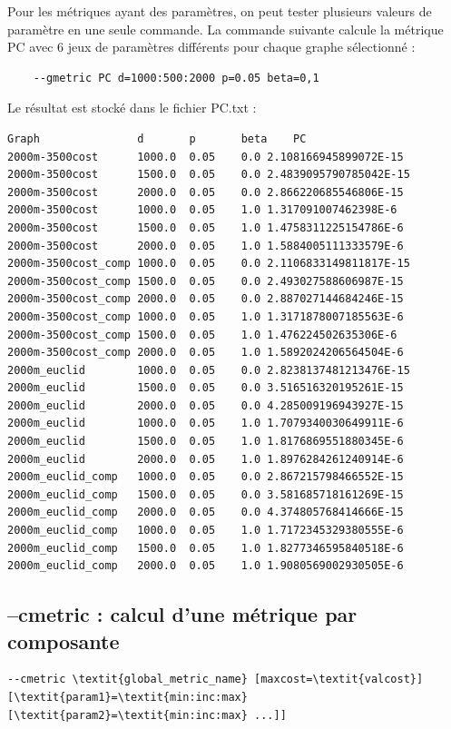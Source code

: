 \documentclass[a4paper,10pt]{report}
\begin{document}
Pour les métriques ayant des paramètres, on peut tester plusieurs valeurs de paramètre en une seule commande.
La commande suivante calcule la métrique PC avec 6 jeux de paramètres différents pour chaque graphe sélectionné :
\begin{Verbatim}
	--gmetric PC d=1000:500:2000 p=0.05 beta=0,1
\end{Verbatim}
Le résultat est stocké dans le fichier PC.txt :
\begin{Verbatim}
Graph               d     	p   	beta	PC
2000m-3500cost      1000.0	0.05	0.0	2.108166945899072E-15
2000m-3500cost      1500.0	0.05	0.0	2.4839095790785042E-15
2000m-3500cost      2000.0	0.05	0.0	2.866220685546806E-15
2000m-3500cost      1000.0	0.05	1.0	1.317091007462398E-6
2000m-3500cost      1500.0	0.05	1.0	1.4758311225154786E-6
2000m-3500cost      2000.0	0.05	1.0	1.5884005111333579E-6
2000m-3500cost_comp 1000.0	0.05	0.0	2.1106833149811817E-15
2000m-3500cost_comp 1500.0	0.05	0.0	2.493027588606987E-15
2000m-3500cost_comp 2000.0	0.05	0.0	2.887027144684246E-15
2000m-3500cost_comp 1000.0	0.05	1.0	1.3171878007185563E-6
2000m-3500cost_comp 1500.0	0.05	1.0	1.476224502635306E-6
2000m-3500cost_comp 2000.0	0.05	1.0	1.5892024206564504E-6
2000m_euclid        1000.0	0.05	0.0	2.8238137481213476E-15
2000m_euclid        1500.0	0.05	0.0	3.516516320195261E-15
2000m_euclid        2000.0	0.05	0.0	4.285009196943927E-15
2000m_euclid        1000.0	0.05	1.0	1.7079340030649911E-6
2000m_euclid        1500.0	0.05	1.0	1.8176869551880345E-6
2000m_euclid        2000.0	0.05	1.0	1.8976284261240914E-6
2000m_euclid_comp   1000.0	0.05	0.0	2.867215798466552E-15
2000m_euclid_comp   1500.0	0.05	0.0	3.581685718161269E-15
2000m_euclid_comp   2000.0	0.05	0.0	4.374805768414666E-15
2000m_euclid_comp   1000.0	0.05	1.0	1.7172345329380555E-6
2000m_euclid_comp   1500.0	0.05	1.0	1.8277346595840518E-6
2000m_euclid_comp   2000.0	0.05	1.0	1.9080569002930505E-6
\end{Verbatim}



\subsection{--cmetric : calcul d'une métrique par composante}
\begin{Verbatim}[commandchars=\\\{\}]
--cmetric \textit{global_metric_name} [maxcost=\textit{valcost}] [\textit{param1}=\textit{min:inc:max} [\textit{param2}=\textit{min:inc:max} ...]]
\end{Verbatim}
\end{document}
